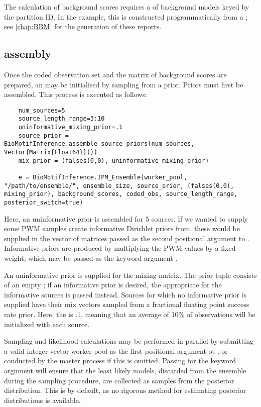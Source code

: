 The calculation of background scores requires a  of  background models keyed by the partition ID. In the example, this is constructed programmatically from a ; see \autoref{chap:BBM} for the generation of these reports.

\subsection{\protect{} assembly}
Once the coded observation set and the matrix of background scores are prepared, an  may be initialised by sampling from a prior. Priors must first be assembled. This process is executed as follows:

\begin{verbatim}
    num_sources=5
    source_length_range=3:10
    uninformative_mixing_prior=.1
    source_prior = BioMotifInference.assemble_source_priors(num_sources, Vector{Matrix{Float64}}())
    mix_prior = (falses(0,0), uninformative_mixing_prior)

    e = BioMotifInference.IPM_Ensemble(worker_pool, "/path/to/ensemble/", ensemble_size, source_prior, (falses(0,0), mixing_prior), background_scores, coded_obs, source_length_range, posterior_switch=true)
\end{verbatim}

Here, an uninformative prior is assembled for 5 sources. If we wanted to supply some PWM samples create informative Dirichlet priors from, these would be supplied in the vector of matrices passed as the second positional argument to . Informative priors are produced by multiplying the PWM values by a fixed weight, which may be passed as the keyword argument .

An uninformative prior is supplied for the mixing matrix. The prior tuple consists of an empty ; if an informative prior is desired, the appropriate  for the informative sources is passed instead. Sources for which no informative prior is supplied have their mix vectors sampled from a fractional floating point success rate prior. Here, the  is .1, meaning that an average of 10\% of observations will be initialized with each source.

Sampling and likelihood calculations may be performed in parallel by submitting a valid integer vector worker pool as the first positional argument ot , or conducted by the master process if this is omitted. Passing  for the keyword argument  will ensure that the least likely models, discarded from the ensemble during the sampling procedure, are collected as samples from the posterior distribution. This is  by default, as no rigorous method for estimating posterior distributions is available.

